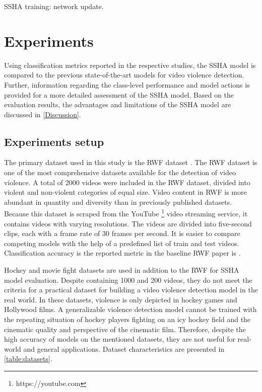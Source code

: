 \documentclass[review]{elsarticle}
\begin{document}
\begin{algorithm}
  \caption{SSHA training: network update.}
  \label{alg:update}
  \begin{algorithmic}[1]
    \STATE  \\ \hskip\algorithmicindent 
    \IF{}
        \STATE 
    \ELSE
        \STATE 
    \ENDIF
    \STATE
    \IF{}
        \STATE 
    \ENDIF
    \STATE
    \STATE { \\ \hskip\algorithmicindent }
    \STATE 
    \STATE 
    \STATE 
  \end{algorithmic}
\end{algorithm}


\section{Experiments}
\label{Experiments}


Using classification metrics reported in the respective studies, the SSHA model is compared to the previous state-of-the-art models for video violence detection. Further, information regarding the class-level performance and model actions is provided for a more detailed assessment of the SSHA model. Based on the evaluation results, the advantages and limitations of the SSHA model are discussed in \autoref{Discussion}.

\subsection{Experiments setup}

The primary dataset used in this study is the RWF dataset \citep{cheng2021rwf}. The RWF dataset is one of the most comprehensive datasets available for the detection of video violence. A total of 2000 videos were included in the RWF dataset, divided into violent and non-violent categories of equal size. Video content in RWF is more abundant in quantity and diversity than in previously published datasets. Because this dataset is scraped from the YouTube \footnote{https://youtube.com} video streaming service, it contains videos with varying resolutions. The videos are divided into five-second clips, each with a frame rate of 30 frames per second. It is easier to compare competing models with the help of a predefined list of train and test videos. Classification accuracy is the reported metric in the baseline RWF paper is \citep{cheng2021rwf}.



Hockey and movie fight datasets are used in addition to the RWF for SSHA model evaluation. Despite containing 1000 and 200 videos, they do not meet the criteria for a practical dataset for building a video violence detection model in the real world. In these datasets, violence is only depicted in hockey games and Hollywood films. A generalizable violence detection model cannot be trained with the repeating situation of hockey players fighting on an icy hockey field and the cinematic quality and perspective of the cinematic film. Therefore, despite the high accuracy of models on the mentioned datasets, they are not useful for real-world and general applications. Dataset characteristics are presented in \autoref{table:datasets}.
\end{document}
